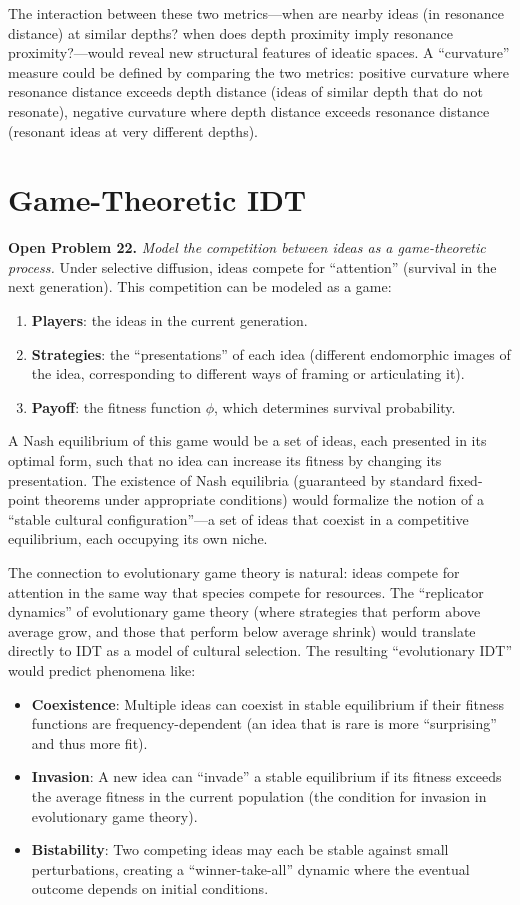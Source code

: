 \documentclass[11pt,openany]{book}
\theoremstyle{definition}
\theoremstyle{plain}
\theoremstyle{remark}
\begin{document}
The interaction between these two metrics---when are nearby ideas (in resonance distance) at similar depths? when does depth proximity imply resonance proximity?---would reveal new structural features of ideatic spaces. A ``curvature'' measure could be defined by comparing the two metrics: positive curvature where resonance distance exceeds depth distance (ideas of similar depth that do not resonate), negative curvature where depth distance exceeds resonance distance (resonant ideas at very different depths).

\section{Game-Theoretic IDT}

\textbf{Open Problem 22.} \emph{Model the competition between ideas as a game-theoretic process.} Under selective diffusion, ideas compete for ``attention'' (survival in the next generation). This competition can be modeled as a game:
\begin{enumerate}
\item \textbf{Players}: the ideas in the current generation.
\item \textbf{Strategies}: the ``presentations'' of each idea (different endomorphic images of the idea, corresponding to different ways of framing or articulating it).
\item \textbf{Payoff}: the fitness function $\phi$, which determines survival probability.
\end{enumerate}

A Nash equilibrium of this game would be a set of ideas, each presented in its optimal form, such that no idea can increase its fitness by changing its presentation. The existence of Nash equilibria (guaranteed by standard fixed-point theorems under appropriate conditions) would formalize the notion of a ``stable cultural configuration''---a set of ideas that coexist in a competitive equilibrium, each occupying its own niche.

The connection to evolutionary game theory is natural: ideas compete for attention in the same way that species compete for resources. The ``replicator dynamics'' of evolutionary game theory (where strategies that perform above average grow, and those that perform below average shrink) would translate directly to IDT as a model of cultural selection. The resulting ``evolutionary IDT'' would predict phenomena like:
\begin{itemize}
\item \textbf{Coexistence}: Multiple ideas can coexist in stable equilibrium if their fitness functions are frequency-dependent (an idea that is rare is more ``surprising'' and thus more fit).
\item \textbf{Invasion}: A new idea can ``invade'' a stable equilibrium if its fitness exceeds the average fitness in the current population (the condition for invasion in evolutionary game theory).
\item \textbf{Bistability}: Two competing ideas may each be stable against small perturbations, creating a ``winner-take-all'' dynamic where the eventual outcome depends on initial conditions.
\end{itemize}
\end{document}
